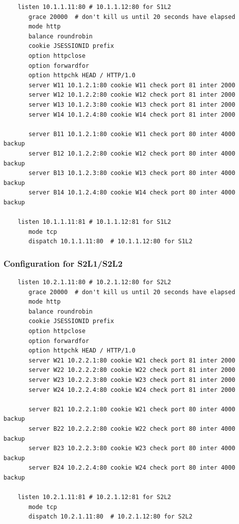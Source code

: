 \begin{verbatim}
    listen 10.1.1.11:80 # 10.1.1.12:80 for S1L2
       grace 20000  # don't kill us until 20 seconds have elapsed
       mode http
       balance roundrobin
       cookie JSESSIONID prefix
       option httpclose
       option forwardfor
       option httpchk HEAD / HTTP/1.0
       server W11 10.1.2.1:80 cookie W11 check port 81 inter 2000
       server W12 10.1.2.2:80 cookie W12 check port 81 inter 2000
       server W13 10.1.2.3:80 cookie W13 check port 81 inter 2000
       server W14 10.1.2.4:80 cookie W14 check port 81 inter 2000

       server B11 10.1.2.1:80 cookie W11 check port 80 inter 4000 backup
       server B12 10.1.2.2:80 cookie W12 check port 80 inter 4000 backup
       server B13 10.1.2.3:80 cookie W13 check port 80 inter 4000 backup
       server B14 10.1.2.4:80 cookie W14 check port 80 inter 4000 backup

    listen 10.1.1.11:81 # 10.1.1.12:81 for S1L2
       mode tcp
       dispatch 10.1.1.11:80  # 10.1.1.12:80 for S1L2
\end{verbatim}

\subsubsection{Configuration for S2L1/S2L2}

\begin{verbatim}
    listen 10.2.1.11:80 # 10.2.1.12:80 for S2L2
       grace 20000  # don't kill us until 20 seconds have elapsed
       mode http
       balance roundrobin
       cookie JSESSIONID prefix
       option httpclose
       option forwardfor
       option httpchk HEAD / HTTP/1.0
       server W21 10.2.2.1:80 cookie W21 check port 81 inter 2000
       server W22 10.2.2.2:80 cookie W22 check port 81 inter 2000
       server W23 10.2.2.3:80 cookie W23 check port 81 inter 2000
       server W24 10.2.2.4:80 cookie W24 check port 81 inter 2000

       server B21 10.2.2.1:80 cookie W21 check port 80 inter 4000 backup
       server B22 10.2.2.2:80 cookie W22 check port 80 inter 4000 backup
       server B23 10.2.2.3:80 cookie W23 check port 80 inter 4000 backup
       server B24 10.2.2.4:80 cookie W24 check port 80 inter 4000 backup

    listen 10.2.1.11:81 # 10.2.1.12:81 for S2L2
       mode tcp
       dispatch 10.2.1.11:80  # 10.2.1.12:80 for S2L2
\end{verbatim}

